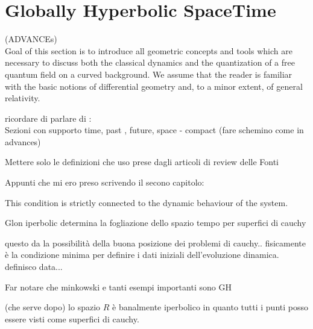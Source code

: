 \documentclass[Main]{subfiles}
\begin{document}
	\section{Globally Hyperbolic SpaceTime}
		\begin{Warning}
		(ADVANCEs)\\
		Goal of this section is to introduce all geometric concepts and tools which are necessary to discuss both the classical dynamics and the quantization of a free quantum field on a curved background. We assume that the reader is familiar with the basic notions of differential geometry and, to a minor extent, of general relativity.
		\end{Warning}
			
		ricordare di parlare di :
		\\ Sezioni con supporto time, past , future, space - compact (fare schemino come in advances)

			\begin{Warning}
				Mettere solo le definizioni che uso prese dagli articoli di review delle Fonti
			\end{Warning}	
			Appunti che mi ero preso scrivendo il secono capitolo:
					
			This condition is strictly connected to the dynamic behaviour of the system.
	
		Glon iperbolic determina la fogliazione dello spazio tempo per superfici di cauchy
		
		questo da la possibilità della buona posizione dei problemi di cauchy.. fisicamente è la condizione minima per definire i dati iniziali dell'evoluzione dinamica.
		definisco data...			
		
		\begin{Warning}
			Far notare che minkowski e tanti esempi importanti sono GH
		\end{Warning}
		
		\begin{observation}
		(che serve dopo) lo spazio $R$ è banalmente iperbolico in quanto tutti i punti posso essere visti come superfici di cauchy.
		\end{observation}
		
\end{document}
